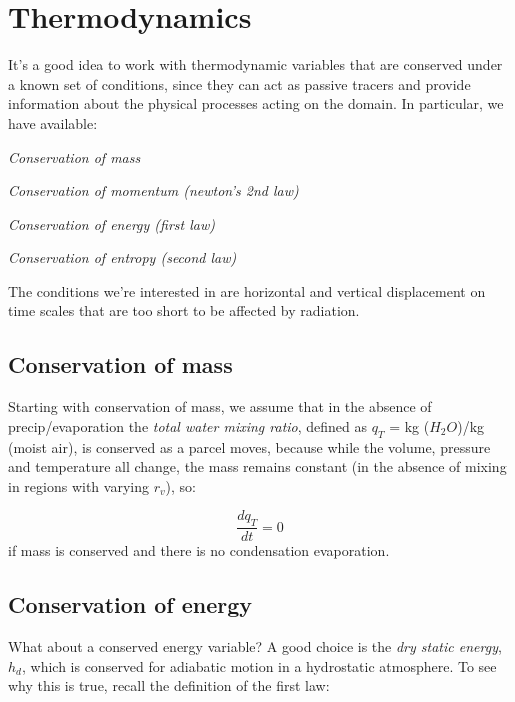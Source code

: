 \documentclass[12pt]{article}
\begin{document}
\pagestyle{first}


\section{Thermodynamics}
\label{sec:thermodynamics}

It's a good idea to work with thermodynamic variables that are conserved under
a known set of conditions, since they can act as passive tracers and provide
information about the physical processes acting on the domain.  In particular,
we have available:

\begin{enumerate*}
  \item \textit{Conservation of mass}
  \item \textit{Conservation of momentum (newton's 2nd law)}
  \item \textit{Conservation of energy (first law)}
  \item \textit{Conservation of entropy (second law)}
\end{enumerate*}

The conditions we're interested in are horizontal and vertical
displacement on time scales that are too short to be affected by
radiation.  



\subsection{Conservation of mass}
\label{sec:conservation-mass}

Starting with conservation of mass, we assume that in the absence
of precip/evaporation the
\textit{total water mixing ratio}, defined as $q_T$ = kg ($H_2O$)/kg
(moist air), is conserved as a parcel moves, because while the volume,
pressure and temperature all change, the mass remains constant (in the
absence of mixing in regions with varying $r_v$), so:

\begin{equation}
  \label{eq:masscons}
  \frac{d q_T}{dt} = 0
\end{equation}
if mass is conserved and there is no condensation evaporation.

\subsection{Conservation of energy}
\label{sec:conservation-energy}

What about a conserved energy variable?  A good choice is the \textit{dry static energy},
$h_d$, which is conserved for adiabatic motion in a hydrostatic atmosphere.
To see why this is true, recall the definition of the first law:
\end{document}
